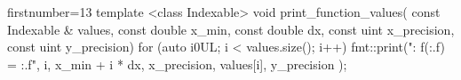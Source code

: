 \begin{cppcode*}{firstnumber=13}
template <class Indexable> 
void print_function_values(
  const Indexable & values, 
  const double x_min, const double dx, 
  const uint x_precision, const uint y_precision) 
{
  for (auto i{0UL}; i < values.size(); i++) {
    fmt::print("{}: f({:.{}f}) = {:.{}f}\n", i, 
      x_min + i * dx, x_precision, 
      values[i], y_precision
    );
  }
}
\end{cppcode*}
